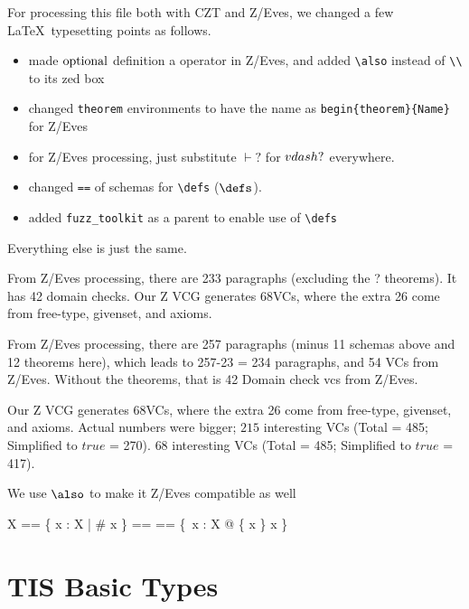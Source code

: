 
For processing this file both with CZT and Z/Eves, we changed a few \LaTeX\ typesetting points as follows.
\begin{itemize}
  \item made $\mathop{\rm optional}$ definition a operator in Z/Eves, and added \verb+\also+ instead of \verb+\\+ to its zed box
  \item changed \verb+theorem+ environments to have the name as \verb'begin{theorem}{Name}' for Z/Eves
  \item for Z/Eves processing, just substitute $\vdash?$ for $\\vdash?$ everywhere.
  \item changed \verb+==+ of schemas for \verb+\defs+ ($\defs$).
  \item added \verb+fuzz_toolkit+ as a parent to enable use of \verb+\defs+
\end{itemize}
Everything else is just the same.

From Z/Eves processing, there are 233 paragraphs (excluding the \vdash? theorems).
It has 42 domain checks. Our Z VCG generates 68VCs, where the extra 26 come from free-type, givenset, and axioms.

From Z/Eves processing, there are 257 paragraphs (minus 11 schemas above and 12 theorems here),
which leads to 257-23 = 234 paragraphs, and 54 VCs from Z/Eves. Without the theorems,
that is 42 Domain check vcs from Z/Eves. 

Our Z VCG generates 68VCs, where the extra 26 come from free-type, givenset, and axioms.
Actual numbers were bigger;
$215$ interesting VCs (Total = 485; Simplified to $true$ = 270).
$68$ interesting VCs (Total = 485; Simplified to $true$ = 417).


We use $\also$ to make it Z/Eves compatible as well

\begin{zed}
        \Optional X == \{ x : \finset X | \# x \}
\also      \Nil[X] == \emptyset[X]
\also      \The[X] == \{~x : X @ \{ x \} \mapsto x \}
\end{zed}

\section{TIS Basic Types}

